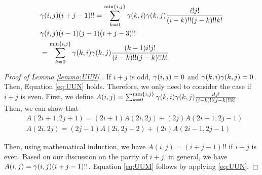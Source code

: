 \documentclass[appliedmath,article,accept,pdftex,moreauthors]{Definitions/mdpi}
\begin{document}

\begin{Lemma}\label{lemma:UUN}
    \begin{align}
        &\gamma(i,j) (i+j-1)!! = \sum_{k=0}^{\min\{i, j\}}
        \gamma(k,i) \gamma(k,j) \frac{i! j!}{(i-k)!!(j-k)!! k!} \label{eq:UUN} \\
             &   \gamma(i,j)(i-1)(j-1)(i+j-3)!!  \notag\\
        &=\sum_{k=0}^{\min\{i, j\}}
        \gamma(k,i) \gamma(k,j) \frac{(k-1)i!j!}{(i-k)!!(j-k)!!k!} \label{eq:UUM}
    \end{align}
\end{Lemma}
\begin{proof}[Proof of Lemma \ref{lemma:UUN} ]
	If $ i + j $ is odd, $ \gamma(i,j) = 0 $ and
	$ \gamma(k,i)\gamma(k,j) = 0 $. Then, Equation \eqref{eq:UUN} holds.
	Therefore, we only need to consider the case if $ i + j $ is even.
	First, we define $A(i, j) = \sum_{k=0}^{\min\{i, j\}}
	\gamma(k,i) \gamma(k,j) \frac{i! j!}{(i-k)!!(j-k)!! k!}$.
	Then, we can show that
	\begin{align*}
	& A(2i+1, 2j+1) = (2i + 1) A(2i, 2j) + (2j) A(2i+1, 2j-1)\\
	& A(2i, 2j)= (2j - 1) A(2i, 2j-2) + (2i) A(2i-1, 2j-1) 
	\end{align*}
	
	{Then,} using mathematical induction, we have $A(i,j) = (i+j-1)!!$ if $i + j $ is even.
	Based on our discussion on the parity of $i+j$, in general, we have $A(i,j)=\gamma(i,j)(i+j-1)!!$.
	Equation \eqref{eq:UUM} follows by applying \eqref{eq:UUN}.
\end{proof}
\end{document}
